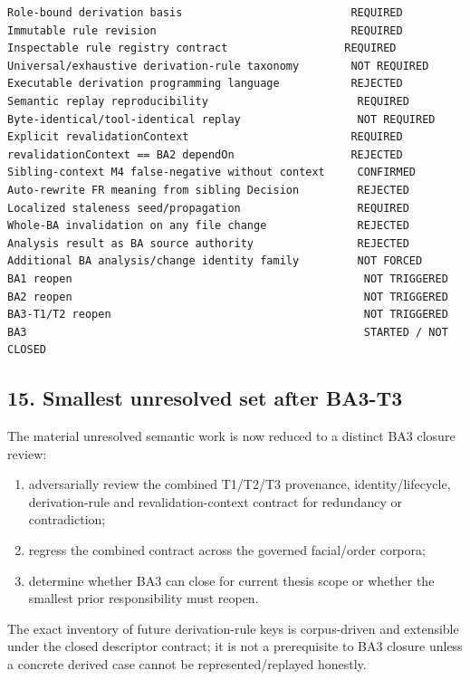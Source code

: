 \documentclass[11pt,a4paper]{article}
\providecommand{\tightlist}{\setlength{\itemsep}{0pt}\setlength{\parskip}{0pt}}
\begin{document}
\begin{verbatim}
Role-bound derivation basis                          REQUIRED
Immutable rule revision                              REQUIRED
Inspectable rule registry contract                  REQUIRED
Universal/exhaustive derivation-rule taxonomy        NOT REQUIRED
Executable derivation programming language           REJECTED
Semantic replay reproducibility                       REQUIRED
Byte-identical/tool-identical replay                  NOT REQUIRED
Explicit revalidationContext                         REQUIRED
revalidationContext == BA2 dependOn                  REJECTED
Sibling-context M4 false-negative without context     CONFIRMED
Auto-rewrite FR meaning from sibling Decision         REJECTED
Localized staleness seed/propagation                  REQUIRED
Whole-BA invalidation on any file change              REJECTED
Analysis result as BA source authority                REJECTED
Additional BA analysis/change identity family         NOT FORCED
BA1 reopen                                             NOT TRIGGERED
BA2 reopen                                             NOT TRIGGERED
BA3-T1/T2 reopen                                       NOT TRIGGERED
BA3                                                    STARTED / NOT CLOSED
\end{verbatim}

\subsection{15. Smallest unresolved set after
BA3-T3}\label{smallest-unresolved-set-after-ba3-t3}

The material unresolved semantic work is now reduced to a distinct BA3
closure review:

\begin{enumerate}
\def\labelenumi{\arabic{enumi}.}
\tightlist
\item
  adversarially review the combined T1/T2/T3 provenance,
  identity/lifecycle, derivation-rule and revalidation-context contract
  for redundancy or contradiction;
\item
  regress the combined contract across the governed facial/order
  corpora;
\item
  determine whether BA3 can close for current thesis scope or whether
  the smallest prior responsibility must reopen.
\end{enumerate}

The exact inventory of future derivation-rule keys is corpus-driven and
extensible under the closed descriptor contract; it is not a
prerequisite to BA3 closure unless a concrete derived case cannot be
represented/replayed honestly.
\end{document}
